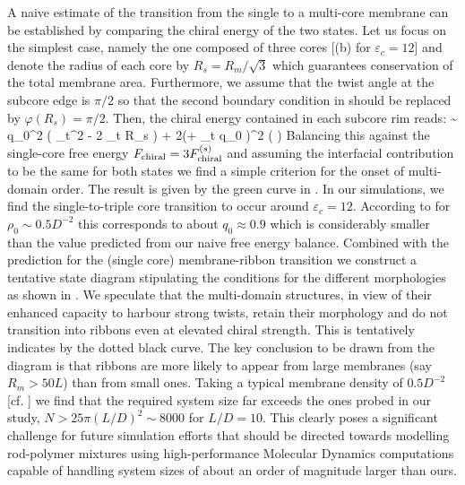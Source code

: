  A naive estimate of the transition from the single to a multi-core membrane can be established by comparing the chiral energy of the two states. Let us focus on the simplest case, namely the one composed of three cores [(b) for $\varepsilon_{c}=12$] and denote the radius of each core by $R_{s} = R_{m}/\sqrt{3}$ which guarantees conservation of the total membrane area. Furthermore, we assume that the twist angle at the subcore edge is $\pi/2$ so that the second boundary condition in  should be replaced by $\varphi(R_{s}) = \pi/2 $. Then, the chiral energy contained in each subcore rim reads:
 \beq
   \sim {} q_{0}^{2} \left ( \lambda_{t}^{2} - 2 \lambda_{t} R_{s} \right ) + 2(\pi + \lambda_{t} q_{0} )^{2} \ln \left (  \right ) 
 \eeq
Balancing this against the single-core free energy $F_{\rm chiral} = 3 F_{\rm chiral}^{(s)}$ and assuming the interfacial contribution to be the same for both states we find a simple criterion for the onset of multi-domain order. The result is given by the green curve in .  In our simulations, we find the single-to-triple core transition to occur around $\varepsilon_{c} =12$.  According to  for $\rho_{0} \sim 0.5D^{-2}$ this  corresponds to about $q_{0} \approx 0.9$ which is considerably smaller than the value predicted from our naive free energy balance. Combined with the prediction for the (single core) membrane-ribbon transition we construct a tentative state diagram stipulating the conditions for the different morphologies as shown in . We speculate that the multi-domain structures, in view of their enhanced capacity to harbour strong twists,  retain their morphology and do not transition into ribbons even at elevated chiral strength. This is tentatively indicates by the dotted black curve. The key conclusion to be drawn  from the diagram is that ribbons are more likely to appear from large membranes (say $R_{m}  > 50 L$) than from small ones. Taking a typical membrane density of $0.5 D^{-2}$ [cf. ] we find that the required system size far exceeds the ones probed in our study,  $N > 25 \pi (L/D)^{2} \sim 8000$ for $L/D = 10$.  This clearly poses a significant challenge for future simulation efforts that should be directed towards modelling rod-polymer mixtures using high-performance Molecular Dynamics computations capable of handling system sizes of about an order of magnitude larger than ours. 






